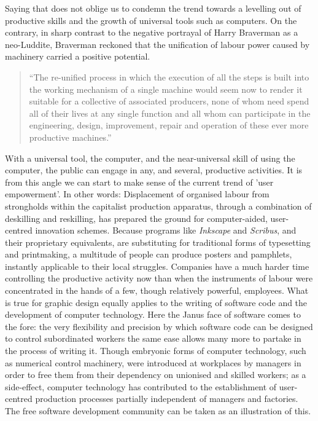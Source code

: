 Saying that does not oblige us to condemn the trend towards a levelling out of
productive skills and the growth of universal tools such as computers. On the
contrary, in sharp contrast to the negative portrayal of Harry Braverman as a
neo-Luddite, Braverman reckoned that the unif\hbox{}ication of labour power caused by
machinery carried a positive potential. 

\begin{quote}
``The re-unif\hbox{}ied process in which the execution of all the steps is built
into the working mechanism of a single machine would seem now to render it
suitable for a collective of associated producers, none of whom need spend all
of their lives at any single function and all whom can participate in the
engineering, design, improvement, repair and operation of these ever more
productive machines.''\cite{gnunited-braverman98-320}
\end{quote}

With a universal tool, the computer, and the near-universal skill of using the
computer, the public can engage in any, and several, productive activities. It
is from this angle we can start to make sense of the current trend of 'user
empowerment'. In other words: Displacement of organised labour from strongholds
within the capitalist production apparatus, through a combination of deskilling
and reskilling, has prepared the ground for computer-aided, user-centred
innovation schemes. Because programs like \textit{Inkscape} and
\textit{Scribus}, and their proprietary equivalents, are substituting for
traditional forms of typesetting and printmaking, a multitude of people can
produce posters and pamphlets, instantly applicable to their local struggles.
Companies have a much harder time controlling the productive activity now than
when the instruments of labour were concentrated in the hands of a few, though
relatively powerful, employees. What is true for graphic design equally applies
to the writing of software code and the development of computer technology. Here
the Janus face of software comes to the fore: the very f\hbox{}lexibility and
precision by which software code can be designed to control subordinated workers
the same ease allows many more to partake in the process of writing it. Though
embryonic forms of computer technology, such as numerical control machinery,
were introduced at workplaces by managers in order to free them from their
dependency on unionised and skilled workers; as a side-ef\hbox{}fect, computer
technology has contributed to the establishment of user-centred production
processes partially independent of managers and factories. The free software
development community can be taken as an illustration of this.


